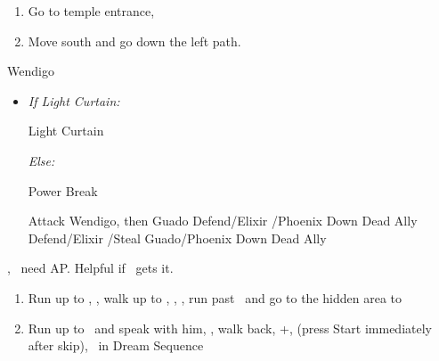 \begin{enumerate}[resume]
	\item Go to temple entrance, \sd
	\item Move south and go down the left path.
\end{enumerate}
\begin{battle}[18000]{Wendigo}
	\begin{itemize}
		\tidusf Haste \tidus
		\tidusf Switch Weapon to Brotherhood
		\tidusf Attack Guado B (Top One)
		\item \textit{If Light Curtain:}
		      \begin{itemize}
			      \rikkuf Light Curtain \tidus
		      \end{itemize}
		      \textit{Else:}
		      \begin{itemize}
			      \switch{\rikku}{\auron}
			      \auronf Power Break
		      \end{itemize}
		      \tidusf Attack Wendigo, then Guado
		      \yunaf Defend/Elixir \tidus/Phoenix Down Dead Ally
		      \rikkuf Defend/Elixir \tidus/Steal Guado/Phoenix Down Dead Ally
		      \switch{\yuna}{\lulu}
	\end{itemize}
	\yuna, \tidus\ need AP. Helpful if \lulu\ gets it.
\end{battle}
\begin{enumerate}[resume]
	\item Run up to \rikku, \sd, walk up to \yuna, \sd, \save, run past \kimahri\ and go to the hidden area to 
	\item Run up to \auron\ and speak with him, \sd, walk back, \cs+\skippablefmv[1:00], (press Start immediately after skip), \sd\ in Dream Sequence
\end{enumerate}